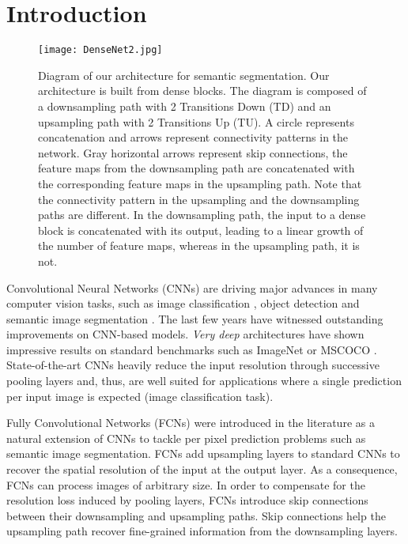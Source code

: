 \documentclass[10pt,twocolumn,letterpaper]{article}
\begin{document}
\section{Introduction}
\label{sec:intro} 

\begin{figure}[t!]
\centering
  \texttt{[image: DenseNet2.jpg]}
  \label{fig:schema}	
  \caption{Diagram of our architecture for semantic segmentation. Our architecture is built from dense blocks. The diagram is composed of a downsampling path with 2 Transitions Down (TD) and an upsampling path with 2 Transitions Up (TU). A circle represents concatenation and arrows represent connectivity patterns in the network. Gray horizontal arrows represent skip connections, the feature maps from the downsampling path are concatenated with the corresponding feature maps in the upsampling path. Note that the connectivity pattern in the upsampling and the downsampling paths are different. In the downsampling path, the input to a dense block is concatenated with its output, leading to a linear growth of the number of feature maps, whereas in the upsampling path, it is not.}
\end{figure}

Convolutional Neural Networks (CNNs) are driving major advances in many computer vision tasks, such as image classification \cite{SimonyanZ14a}, object detection \cite{RenHG015,RedmonDGF15} and semantic image segmentation \cite{long2015fully}. The last few years have witnessed outstanding improvements on CNN-based models. \emph{Very deep} architectures \cite{SimonyanZ14a,HeZRS15,SzegedyLJSRAEVR14} have shown impressive results on standard benchmarks such as ImageNet \cite{imagenet_cvpr09} or MSCOCO \cite{mscoco}. State-of-the-art CNNs heavily reduce the input resolution through successive pooling layers and, thus, are well suited for applications where a single prediction per input image is expected (\eg image classification task). 

Fully Convolutional Networks (FCNs) \cite{long2015fully,ronneberger2015u} were introduced in the literature as a natural extension of CNNs to tackle per pixel prediction problems such as semantic image segmentation. FCNs add upsampling layers to standard CNNs to recover the spatial resolution of the input at the output layer. As a consequence, FCNs can process images of arbitrary size. In order to compensate for the resolution loss induced by pooling layers, FCNs introduce skip connections between their downsampling and upsampling paths. Skip connections help the upsampling path recover fine-grained information from the downsampling layers. 
\end{document}
